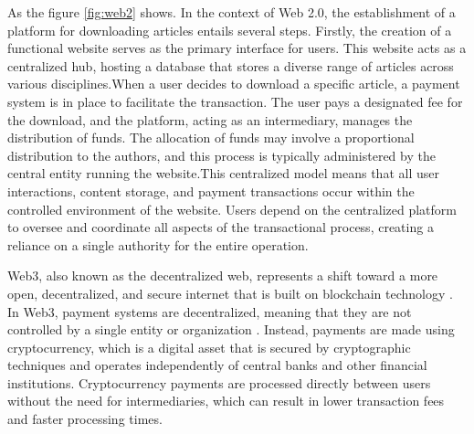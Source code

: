 \documentclass[lettersize,journal]{IEEEtran}
\begin{document}
As the figure \ref{fig:web2} shows. In the context of Web 2.0, the establishment of a platform for downloading articles entails several steps. Firstly, the creation of a functional website serves as the primary interface for users. This website acts as a centralized hub, hosting a database that stores a diverse range of articles across various disciplines.When a user decides to download a specific article, a payment system is in place to facilitate the transaction. The user pays a designated fee for the download, and the platform, acting as an intermediary, manages the distribution of funds. The allocation of funds may involve a proportional distribution to the authors, and this process is typically administered by the central entity running the website.This centralized model means that all user interactions, content storage, and payment transactions occur within the controlled environment of the website. Users depend on the centralized platform to oversee and coordinate all aspects of the transactional process, creating a reliance on a single authority for the entire operation.



Web3, also known as the decentralized web, represents a shift toward a more open, decentralized, and secure internet that is built on blockchain technology \cite{alabdulwahhab2018web}. In Web3, payment systems are decentralized, meaning that they are not controlled by a single entity or organization \cite{cao2022decentralized}. Instead, payments are made using cryptocurrency, which is a digital asset that is secured by cryptographic techniques and operates independently of central banks and other financial institutions. Cryptocurrency payments are processed directly between users without the need for intermediaries, which can result in lower transaction fees and faster processing times.
\end{document}
